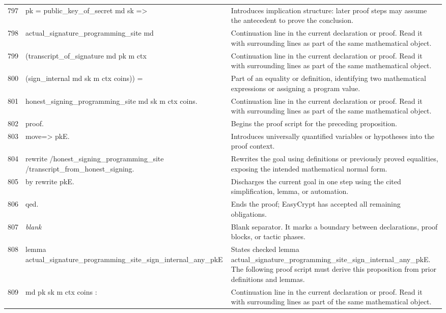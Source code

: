 \documentclass[10pt]{article}
\begin{document}
\begin{longtable}{r L{0.53\textwidth} L{0.37\textwidth}}
797 & {\ttfamily\scriptsize   pk = public\_key\_of\_secret md sk =>} & Introduces implication structure: later proof steps may assume the antecedent to prove the conclusion. \\
798 & {\ttfamily\scriptsize   actual\_signature\_programming\_site md} & Continuation line in the current declaration or proof.  Read it with surrounding lines as part of the same mathematical object. \\
799 & {\ttfamily\scriptsize     (transcript\_of\_signature md pk m ctx} & Continuation line in the current declaration or proof.  Read it with surrounding lines as part of the same mathematical object. \\
800 & {\ttfamily\scriptsize       (sign\_internal md sk m ctx coins)) =} & Part of an equality or definition, identifying two mathematical expressions or assigning a program value. \\
801 & {\ttfamily\scriptsize   honest\_signing\_programming\_site md sk m ctx coins.} & Continuation line in the current declaration or proof.  Read it with surrounding lines as part of the same mathematical object. \\
802 & {\ttfamily\scriptsize proof.} & Begins the proof script for the preceding proposition. \\
803 & {\ttfamily\scriptsize move=> pkE.} & Introduces universally quantified variables or hypotheses into the proof context. \\
804 & {\ttfamily\scriptsize rewrite /honest\_signing\_programming\_site /transcript\_from\_honest\_signing.} & Rewrites the goal using definitions or previously proved equalities, exposing the intended mathematical normal form. \\
805 & {\ttfamily\scriptsize by rewrite pkE.} & Discharges the current goal in one step using the cited simplification, lemma, or automation. \\
806 & {\ttfamily\scriptsize qed.} & Ends the proof; EasyCrypt has accepted all remaining obligations. \\
807 & {\ttfamily\scriptsize \emph{blank}} & Blank separator.  It marks a boundary between declarations, proof blocks, or tactic phases. \\
808 & {\ttfamily\scriptsize lemma actual\_signature\_programming\_site\_sign\_internal\_any\_pkE} & States checked lemma actual\_signature\_programming\_site\_sign\_internal\_any\_pkE.  The following proof script must derive this proposition from prior definitions and lemmas. \\
809 & {\ttfamily\scriptsize   md pk sk m ctx coins :} & Continuation line in the current declaration or proof.  Read it with surrounding lines as part of the same mathematical object. \\

\end{longtable}
\end{document}
